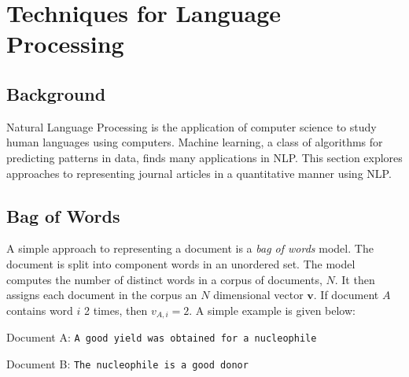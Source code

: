 \chapter{Techniques for Language Processing}
\label{chapt:NLP}
\section{Background}
Natural Language Processing is the application of computer science to study human languages using computers. Machine learning, a class of algorithms for predicting patterns in data, finds many applications in NLP. This section explores approaches to representing journal articles in a quantitative manner using NLP.
\section{Bag of Words}
A simple approach to representing a document is a \emph{bag of words} model. The document is split into component words in an unordered set. The model computes the number of distinct words in a corpus of documents, $N$. It then assigns each document in the corpus an $N$ dimensional vector $\mathbf{v}$. If document $A$ contains word $i$ 2 times, then $v_{A, i } = 2$. A simple example is given below:

Document A: \texttt{A good yield was obtained for a nucleophile}

Document B: \texttt{The nucleophile is a good donor}

